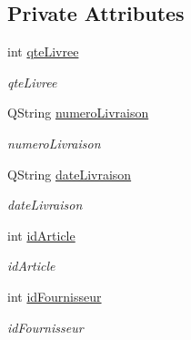 \subsection*{Private Attributes}
\begin{DoxyCompactItemize}
\item 
\mbox{\label{class_livraison_ac2ee001770c2611d4949746d93c76497}} 
int \mbox{\hyperlink{class_livraison_ac2ee001770c2611d4949746d93c76497}{qte\+Livree}}
\begin{DoxyCompactList}\small\item\em qte\+Livree \end{DoxyCompactList}\item 
\mbox{\label{class_livraison_a6abf3db332baa359b0fb79d933147eb0}} 
Q\+String \mbox{\hyperlink{class_livraison_a6abf3db332baa359b0fb79d933147eb0}{numero\+Livraison}}
\begin{DoxyCompactList}\small\item\em numero\+Livraison \end{DoxyCompactList}\item 
\mbox{\label{class_livraison_ae3e31bb8f03b7191b22482deea7d769a}} 
Q\+String \mbox{\hyperlink{class_livraison_ae3e31bb8f03b7191b22482deea7d769a}{date\+Livraison}}
\begin{DoxyCompactList}\small\item\em date\+Livraison \end{DoxyCompactList}\item 
\mbox{\label{class_livraison_a34ff40d4ca59765bc66b57a7a4969dd2}} 
int \mbox{\hyperlink{class_livraison_a34ff40d4ca59765bc66b57a7a4969dd2}{id\+Article}}
\begin{DoxyCompactList}\small\item\em id\+Article \end{DoxyCompactList}\item 
\mbox{\label{class_livraison_ada2fd9015a325e8ff7ccb79d6f2a01f6}} 
int \mbox{\hyperlink{class_livraison_ada2fd9015a325e8ff7ccb79d6f2a01f6}{id\+Fournisseur}}
\begin{DoxyCompactList}\small\item\em id\+Fournisseur \end{DoxyCompactList}\end{DoxyCompactItemize}


